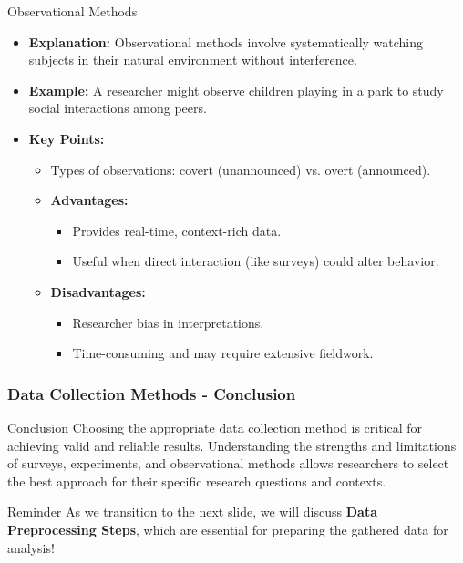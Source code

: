 \documentclass[aspectratio=169]{beamer}
\begin{document}
\begin{frame}[fragile]
    \begin{block}{Observational Methods}
        \begin{itemize}
            \item \textbf{Explanation:} Observational methods involve systematically watching subjects in their natural environment without interference. 
            \item \textbf{Example:} A researcher might observe children playing in a park to study social interactions among peers.
            \item \textbf{Key Points:}
            \begin{itemize}
                \item Types of observations: covert (unannounced) vs. overt (announced).
                \item \textbf{Advantages:} 
                \begin{itemize}
                    \item Provides real-time, context-rich data.
                    \item Useful when direct interaction (like surveys) could alter behavior.
                \end{itemize}
                \item \textbf{Disadvantages:}
                \begin{itemize}
                    \item Researcher bias in interpretations.
                    \item Time-consuming and may require extensive fieldwork.
                \end{itemize}
            \end{itemize}
        \end{itemize}
    \end{block}
\end{frame}

\begin{frame}[fragile]
    \frametitle{Data Collection Methods - Conclusion}
    \begin{block}{Conclusion}
        Choosing the appropriate data collection method is critical for achieving valid and reliable results. 
        Understanding the strengths and limitations of surveys, experiments, and observational methods allows researchers to select the best approach for their specific research questions and contexts.
    \end{block}
    \begin{block}{Reminder}
        As we transition to the next slide, we will discuss \textbf{Data Preprocessing Steps}, which are essential for preparing the gathered data for analysis!
    \end{block}
\end{frame}
\end{document}
